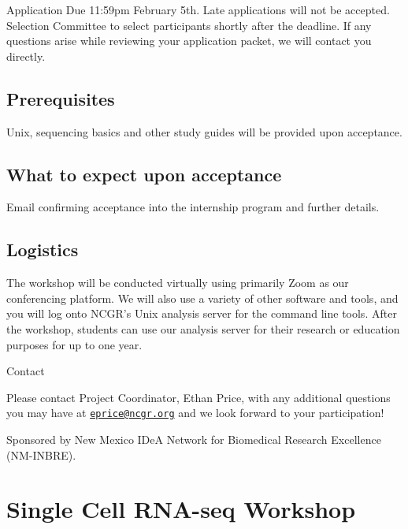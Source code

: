 \documentclass[
]{book}
\begin{document}
Application Due 11:59pm February 5th. Late applications will not be accepted. Selection Committee to select participants shortly after the deadline. If any questions arise while reviewing your application packet, we will contact you directly.

\hypertarget{prerequisites}{%
\section*{Prerequisites}\label{prerequisites}}

Unix, sequencing basics and other study guides will be provided upon acceptance.

\hypertarget{what-to-expect-upon-acceptance}{%
\section*{What to expect upon acceptance}\label{what-to-expect-upon-acceptance}}

Email confirming acceptance into the internship program and further details.

\hypertarget{logistics}{%
\section*{Logistics}\label{logistics}}

The workshop will be conducted virtually using primarily Zoom as our conferencing platform. We will also use a variety of other software and tools, and you will log onto NCGR's Unix analysis server for the command line tools. After the workshop, students can use our analysis server for their research or education purposes for up to one year.

Contact

Please contact Project Coordinator, Ethan Price, with any additional questions you may have at \href{mailto:eprice@ncgr.org}{\nolinkurl{eprice@ncgr.org}} and we look forward to your participation!

Sponsored by New Mexico IDeA Network for Biomedical Research Excellence (NM-INBRE).

\hypertarget{single-cell-rna-seq-workshop}{%
\chapter*{Single Cell RNA-seq Workshop}\label{single-cell-rna-seq-workshop}}
\end{document}
